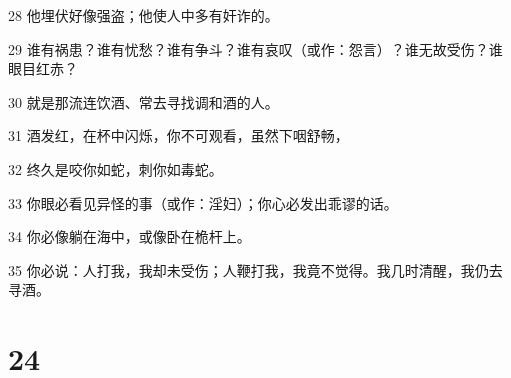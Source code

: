\par 28 他埋伏好像强盗；他使人中多有奸诈的。
\par 29 谁有祸患？谁有忧愁？谁有争斗？谁有哀叹（或作：怨言）？谁无故受伤？谁眼目红赤？
\par 30 就是那流连饮酒、常去寻找调和酒的人。
\par 31 酒发红，在杯中闪烁，你不可观看，虽然下咽舒畅，
\par 32 终久是咬你如蛇，刺你如毒蛇。
\par 33 你眼必看见异怪的事（或作：淫妇）；你心必发出乖谬的话。
\par 34 你必像躺在海中，或像卧在桅杆上。
\par 35 你必说：人打我，我却未受伤；人鞭打我，我竟不觉得。我几时清醒，我仍去寻酒。

\chapter{24}

